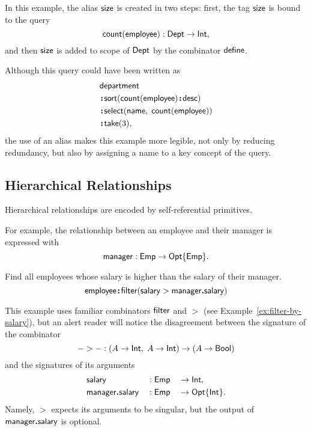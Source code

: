 In this example, the alias $\mathsf{size}$ is created in two steps: first, the tag
$\mathsf{size}$ is bound to the query
\begin{equation*}
    \mathsf{count}(\mathsf{employee}): \mathsf{Dept} \to \mathsf{Int},
\end{equation*}
and then $\mathsf{size}$ is added to scope of $\mathsf{Dept}$ by the combinator $\mathsf{define}$.

Although this query could have been written as
\begin{align*}
    & \Department \\
    & \Apply\Sort(\Count(\Employee)\Apply\Desc) \\
    & \Apply\Select(\Name,\; \Count(\Employee)) \\
    & \Apply\Take(3),
\end{align*}
the use of an alias makes this example more legible, not only by reducing
redundancy, but also by assigning a name to a key concept of the query.

\subsection*{Hierarchical Relationships}

Hierarchical relationships are encoded by self-referential primitives.

For example, the relationship between an employee and their manager is
expressed with
\begin{equation*}
    \mathsf{manager} : \mathsf{Emp} \to \mathsf{Opt}{\left\{\mathsf{Emp}\right\}}.
\end{equation*}

\begin{demo}
    \label{ex:employee-filter-salary-manager}
    Find all employees whose salary is higher than the salary of their manager.
    \begin{equation*}
        \mathsf{employee}\!\boldsymbol{:}\!\mathsf{filter}(\mathsf{salary}>\mathsf{manager}\boldsymbol{.}\mathsf{salary})
    \end{equation*}
\end{demo}

This example uses familiar combinators $\mathsf{filter}$ and ${>}$ (see
Example~\ref{ex:filter-by-salary}), but an alert reader will notice the
disagreement between the signature of the combinator
\begin{equation*}
    {-}>{-} : (A \to \mathsf{Int},\; A \to \mathsf{Int}) \to (A \to \mathsf{Bool})
\end{equation*}
and the signatures of its arguments
\begin{alignat*}{3}
    & \mathsf{salary} && : \mathsf{Emp} && \to \mathsf{Int}, \\
    & \mathsf{manager}\boldsymbol{.}\mathsf{salary} && : \mathsf{Emp} && \to \mathsf{Opt}{\left\{\mathsf{Int}\right\}}.
\end{alignat*}
Namely, ${>}$ expects its arguments to be singular, but the output of
$\mathsf{manager}\boldsymbol{.}\mathsf{salary}$ is optional.


